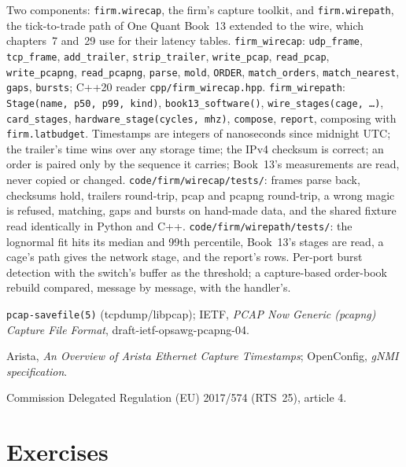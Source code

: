 \begin{build}
 Two components: \texttt{firm.wirecap}, the firm's capture toolkit, and \texttt{firm.wirepath}, the tick-to-trade path of
One Quant Book~13 extended to the wire, which chapters~7 and~29 use for their latency tables.
 \texttt{firm\_wirecap}: \texttt{udp\_frame}, \texttt{tcp\_frame}, \texttt{add\_trailer}, \texttt{strip\_trailer},
\texttt{write\_pcap}, \texttt{read\_pcap}, \texttt{write\_pcapng}, \texttt{read\_pcapng}, \texttt{parse}, \texttt{mold}, \texttt{ORDER},
\texttt{match\_orders}, \texttt{match\_nearest}, \texttt{gaps}, \texttt{bursts}; C++20 reader \texttt{cpp/firm\_wirecap.hpp}.
\texttt{firm\_wirepath}: \texttt{Stage(name, p50, p99, kind)}, \texttt{book13\_software()}, \texttt{wire\_stages(cage, \dots)},
\texttt{card\_stages}, \texttt{hardware\_stage(cycles, mhz)}, \texttt{compose}, \texttt{report}, composing with \texttt{firm.latbudget}.
 Timestamps are integers of nanoseconds since midnight UTC; the trailer's time wins over any storage time; the IPv4 checksum is
correct; an order is paired only by the sequence it carries; Book~13's measurements are read, never copied or changed.
 \texttt{code/firm/wirecap/tests/}: frames parse back, checksums hold, trailers round-trip, pcap and pcapng
round-trip, a wrong magic is refused, matching, gaps and bursts on hand-made data, and the shared fixture read identically in Python and
C++. \texttt{code/firm/wirepath/tests/}: the lognormal fit hits its median and 99th percentile, Book~13's stages are read, a cage's path
gives the network stage, and the report's rows.
 Per-port burst detection with the switch's buffer as the threshold; a capture-based order-book rebuild compared, message by
message, with the handler's.
\end{build}

\begin{omsources}
\item \texttt{pcap-savefile(5)} (tcpdump/libpcap); IETF, \emph{PCAP Now Generic (pcapng) Capture File Format},
draft-ietf-opsawg-pcapng-04.
\item Arista, \emph{An Overview of Arista Ethernet Capture Timestamps}; OpenConfig, \emph{gNMI specification}.
\item Commission Delegated Regulation (EU) 2017/574 (RTS~25), article 4.
\end{omsources}

\section{Exercises}

